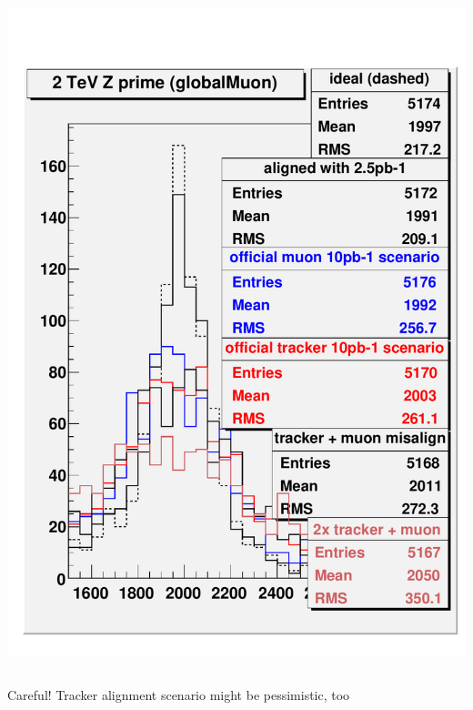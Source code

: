 \documentclass[compress]{beamer}
\begin{document}
\begin{frame}
\begin{columns}
\includegraphics[width=\linewidth]{trackercompare_zprime_2000.pdf}
\end{columns}

\vspace{0.25 cm}
Careful!  Tracker alignment scenario might be pessimistic, too
\label{numpages}
\end{frame}
\end{document}
